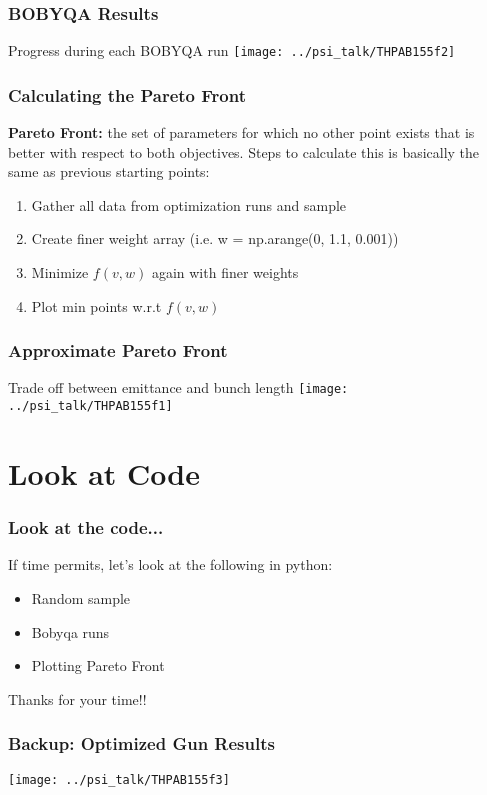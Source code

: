 \documentclass{beamer}
\begin{document}
\begin{frame}
	\frametitle{BOBYQA Results}
	Progress during each BOBYQA run
	\texttt{[image: ../psi\_talk/THPAB155f2]}
\end{frame}

\begin{frame}
	\frametitle{Calculating the Pareto Front}
	\textbf{Pareto Front:} the set of parameters for which
	no other point exists that is better with respect to both objectives. 
	Steps to calculate this is basically the same as previous starting points: \\
	\begin{enumerate}
		\item Gather all data from optimization runs and sample
		\item Create finer weight array (i.e. w = np.arange(0, 1.1, 0.001))
		\item Minimize $f(v,w)$ again with finer weights
		\item Plot min points w.r.t $f(v,w)$
	\end{enumerate}
\end{frame}



\begin{frame}
	\frametitle{Approximate Pareto Front}
	\centering
	Trade off between emittance and bunch length
	\texttt{[image: ../psi\_talk/THPAB155f1]}
\end{frame}

\section{Look at Code}
\begin{frame}
	\frametitle{Look at the code...}
	If time permits, let's look at the following in python:
	\begin{itemize}
		\item Random sample
		\item Bobyqa runs
		\item Plotting Pareto Front
	\end{itemize}
	
\end{frame}

\begin{frame}
	\huge Thanks for your time!!\\ 
	\vskip12pt
\end{frame}

\begin{frame}
	\frametitle{Backup: Optimized Gun Results}
	\texttt{[image: ../psi\_talk/THPAB155f3]}
\end{frame}
\end{document}
